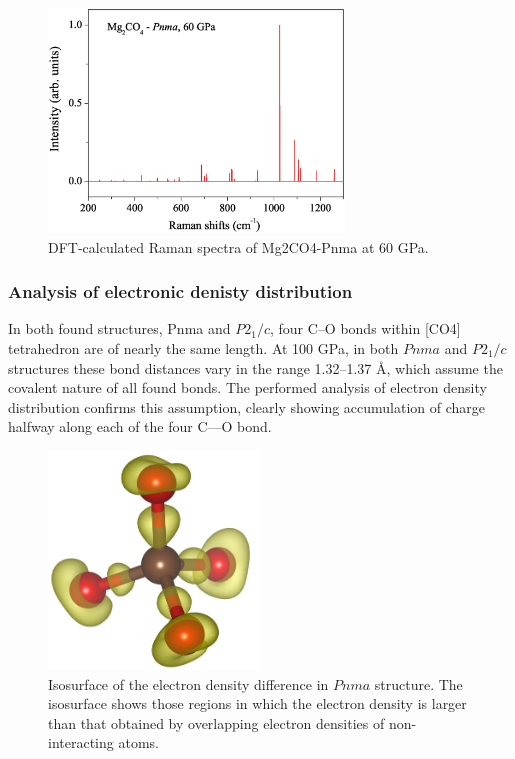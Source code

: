 \documentclass[a4paperm]{article}
\begin{document}
\begin{figure}
	\includegraphics[width=0.7\textwidth]{raman_mg2co4} \centering
	\caption{DFT-calculated Raman spectra of Mg2CO4-Pnma at 60 GPa.}
\end{figure}


\subsubsection*{Analysis of electronic denisty distribution}

In both found structures, Pnma and $P2_1/c$, four C--O bonds within [CO4] tetrahedron are of nearly the same length.
At 100 GPa, in both $Pnma$ and $P2_1/c$ structures these bond distances vary in the range 1.32--1.37 \AA, which assume the covalent nature of all found bonds.
The performed analysis of electron density distribution confirms this assumption, clearly showing accumulation of charge halfway along each of the four C—O bond\label{diff}.


\begin{figure}
	\includegraphics[width=0.5\textwidth]{dens_diff.png} \centering
	\caption{Isosurface of the electron density difference in $Pnma$ structure. The isosurface shows those regions in which the electron density is larger than that obtained by overlapping electron densities of non-interacting atoms.} \label{diff}
\end{figure}
\end{document}

